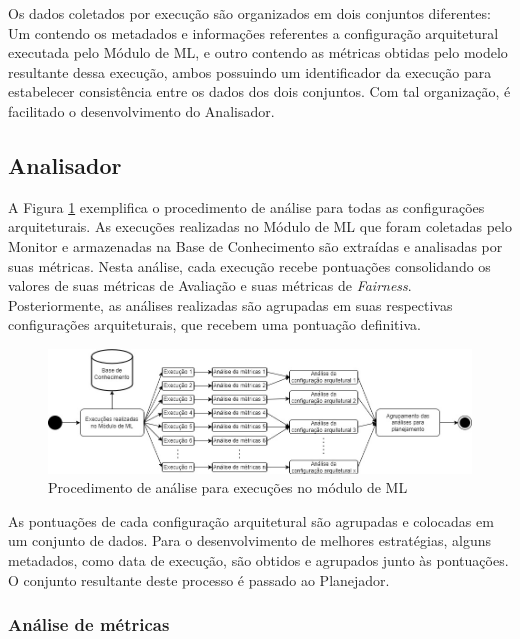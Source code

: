 \documentclass[Portugues,Final]{ic-tese-v3}
\begin{document}
Os dados coletados por execução são organizados em dois conjuntos diferentes: Um contendo os metadados e informações referentes a configuração arquitetural executada pelo Módulo de ML, e outro contendo as métricas obtidas pelo modelo resultante dessa execução, ambos possuindo um identificador da execução para estabelecer consistência entre os dados dos dois conjuntos. Com tal organização, é facilitado o desenvolvimento do Analisador.

\subsection{Analisador}

A Figura \ref{fig:AnaliseModuloML} exemplifica o procedimento de análise para todas as configurações arquiteturais. As execuções realizadas no Módulo de ML que foram coletadas pelo Monitor e armazenadas na Base de Conhecimento são extraídas e analisadas por suas métricas. Nesta análise, cada execução recebe pontuações consolidando os valores de suas métricas de Avaliação e suas métricas de \textit{Fairness}. Posteriormente, as análises realizadas são agrupadas em suas respectivas configurações arquiteturais, que recebem uma pontuação definitiva. 

\begin{figure}[H]
\centering
\includegraphics[scale=0.5]{images/Procedimento_Analise.jpg}
\caption {Procedimento de análise para execuções no módulo de ML}
\label{fig:AnaliseModuloML}
\end{figure}

As pontuações de cada configuração arquitetural são agrupadas e colocadas em um conjunto de dados. Para o desenvolvimento de melhores estratégias, alguns metadados, como data de execução, são obtidos e agrupados junto às pontuações. O conjunto resultante deste processo é passado ao Planejador.

\subsubsection{Análise de métricas}
\end{document}
